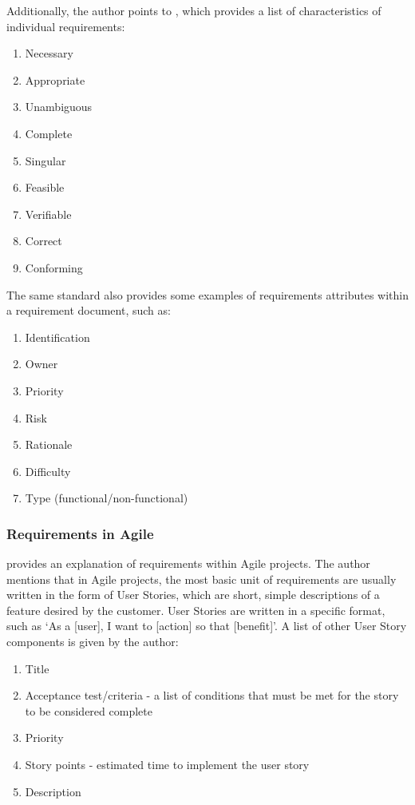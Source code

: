 Additionally, the author points to \textcite{requirements2}, which provides a list of characteristics of individual requirements:
\begin{enumerate}
    \item Necessary
    \item Appropriate
    \item Unambiguous
    \item Complete
    \item Singular
    \item Feasible
    \item Verifiable
    \item Correct
    \item Conforming
\end{enumerate}

The same standard also provides some examples of requirements attributes within a requirement document, such as:
\begin{enumerate}
    \item Identification
    \item Owner
    \item Priority
    \item Risk
    \item Rationale
    \item Difficulty
    \item Type (functional/non-functional)
\end{enumerate}

\subsubsection{Requirements in Agile}

\textcite[191]{requirements} provides an explanation of requirements within Agile projects. The author mentions that in Agile projects, the most basic unit of requirements are usually written in the form of User Stories, which are short, simple descriptions of a feature desired by the customer. User Stories are written in a specific format, such as `As a [user], I want to [action] so that [benefit]'. A list of other User Story components is given by the author:
\begin{enumerate}
    \item Title
    \item Acceptance test/criteria - a list of conditions that must be met for the story to be considered complete
    \item Priority
    \item Story points - estimated time to implement the user story
    \item Description
\end{enumerate}

